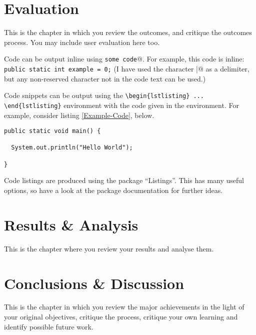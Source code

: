 \documentclass[11pt,openright,a4paper]{report}
\begin{document}
\chapter{Evaluation}
This is the chapter in which you review the outcomes, and
critique the outcomes process.  You may include user evaluation here
too.

Code can be output inline using \verb@\lstinline|some code|@.  For example,
this code is inline: \lstinline|public static int example = 0;|  (I have
used the character \verb@|@ as a delimiter, but any non-reserved character
not in the code text can be used.)

Code snippets can be output using the \verb|\begin{lstlisting} ... \end{lstlisting}|
environment with the code given in the environment.  For
example, consider listing \ref{Example-Code}, below.

\begin{lstlisting}[breaklines,breakatwhitespace,caption={Example code},label=Example-Code]
public static void main() {

  System.out.println("Hello World");

}
\end{lstlisting}

Code listings are produced using the package ``Listings''.  This has many
useful options, so have a look at the package documentation for further
ideas.


\chapter{Results \& Analysis}
This is the chapter where you review your results and analyse them.



\chapter{Conclusions \& Discussion}
%

This is the chapter in which you review the major achievements in the
light of your original objectives, critique the process, critique your
own learning and identify possible future work.



\end{document}
